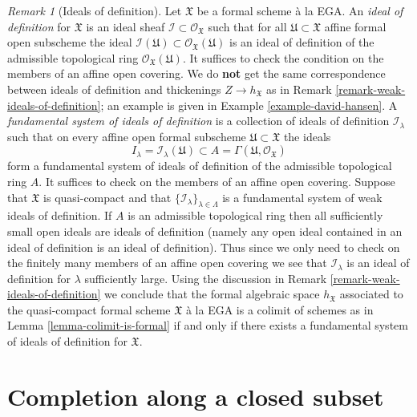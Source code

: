\documentclass{stacks-project}
\theoremstyle{plain}
\theoremstyle{definition}
\theoremstyle{remark}
\newtheorem{remark}[subsection]{Remark}
\numberwithin{equation}{subsection}
\begin{document}
\begin{remark}[Ideals of definition]
\label{remark-ideals-of-definition}
Let $\mathfrak X$ be a formal scheme \`a la EGA.
An {\it ideal of definition} for $\mathfrak X$ is an ideal sheaf
$\mathcal{I} \subset \mathcal{O}_\mathfrak X$ such that
for all $\mathfrak U \subset \mathfrak X$ affine formal open subscheme
the ideal
$\mathcal{I}(\mathfrak U) \subset \mathcal{O}_\mathfrak X(\mathfrak U)$
is an ideal of definition of the admissible topological ring
$\mathcal{O}_\mathfrak X(\mathfrak U)$.
It suffices to check the condition on the members of an affine open covering.
We do {\bf not} get the same correspondence between ideals of definition
and thickenings $Z \to h_\mathfrak X$ as in
Remark \ref{remark-weak-ideals-of-definition}; an example
is given in Example \ref{example-david-hansen}.
A {\it fundamental system of ideals of definition}
is a collection of ideals of definition
$\mathcal{I}_\lambda$ such that on every affine open
formal subscheme $\mathfrak U \subset \mathfrak X$ the
ideals
$$
I_\lambda = \mathcal{I}_\lambda(\mathfrak U) \subset
A = \Gamma(\mathfrak U, \mathcal{O}_\mathfrak X)
$$
form a fundamental system of ideals of definition of the
admissible topological ring $A$. It suffices to check
on the members of an affine open covering. Suppose that $\mathfrak X$
is quasi-compact and that $\{\mathcal{I}_\lambda\}_{\lambda \in \Lambda}$
is a fundamental system of weak ideals of definition.
If $A$ is an admissible topological ring then all
sufficiently small open ideals are ideals of definition
(namely any open ideal contained in an ideal of definition
is an ideal of definition). Thus since we only need to check
on the finitely many members of an affine open covering
we see that $\mathcal{I}_\lambda$ is an ideal of definition
for $\lambda$ sufficiently large. Using the discussion in
Remark \ref{remark-weak-ideals-of-definition} we conclude that
the formal algebraic space $h_\mathfrak X$ associated to
the quasi-compact formal scheme $\mathfrak X$ \`a la EGA
is a colimit of schemes as in Lemma \ref{lemma-colimit-is-formal}
if and only if there exists a fundamental system of ideals of definition
for $\mathfrak X$.
\end{remark}






\section{Completion along a closed subset}
\label{section-completion}
\end{document}
